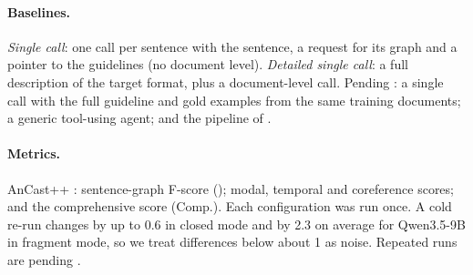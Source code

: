\paragraph{Baselines.}
\emph{Single call}: one call per sentence with the sentence, a request for its \umr graph and a pointer to the guidelines (no document level). \emph{Detailed single call}: a full description of the target format, plus a document-level call. Pending : a single call with the full guideline and gold examples from the same training documents; a generic tool-using agent; and the pipeline of \citet{chun2024pipeline}.

\paragraph{Metrics.}
AnCast++ \citep{sun2024ancast}: sentence-graph F-score (\F); modal, temporal and coreference scores; and the comprehensive score (Comp.). Each configuration was run once. A cold re-run changes \F by up to 0.6 in closed mode and by 2.3 on average for Qwen3.5-9B in fragment mode, so we treat differences below about 1 \F as noise. Repeated runs are pending .
